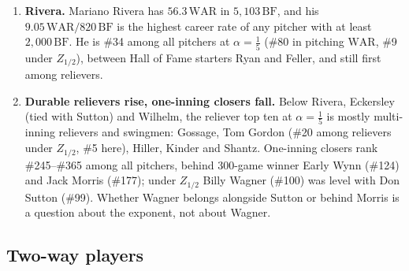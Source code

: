 \documentclass[11pt,letterpaper]{article}
\theoremstyle{plain}
\theoremstyle{definition}
\theoremstyle{remark}
\newcommand{\WAR}{\mathrm{WAR}}
\newcommand{\BF}{\mathrm{BF}}
\begin{document}
\begin{enumerate}
    \item \textbf{Rivera.} Mariano Rivera has $56.3\,\WAR$ in $5{,}103\,\BF$, and his $9.05\,\WAR/820\,\BF$ is the highest career rate of any pitcher with at least $2{,}000\,\BF$. He is \#34 among all pitchers at $\alpha = \tfrac15$ (\#80 in pitching $\WAR$, \#9 under $Z_{1/2}$), between Hall of Fame starters Ryan and Feller, and still first among relievers.
    \item \textbf{Durable relievers rise, one-inning closers fall.} Below Rivera, Eckersley (tied with Sutton) and Wilhelm, the reliever top ten at $\alpha = \tfrac15$ is mostly multi-inning relievers and swingmen: Gossage, Tom Gordon (\#20 among relievers under $Z_{1/2}$, \#5 here), Hiller, Kinder and Shantz. One-inning closers rank \#245--\#365 among all pitchers, behind 300-game winner Early Wynn (\#124) and Jack Morris (\#177); under $Z_{1/2}$ Billy Wagner (\#100) was level with Don Sutton (\#99). Whether Wagner belongs alongside Sutton or behind Morris is a question about the exponent, not about Wagner.
\end{enumerate}

\subsection{Two-way players}
\label{sec:twoway_empirical}
\end{document}
